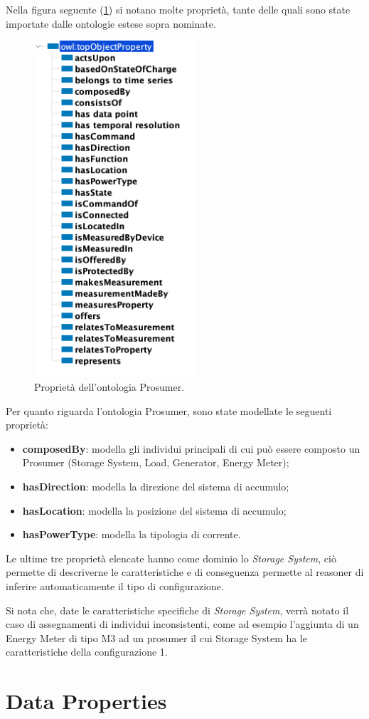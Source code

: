 Nella figura seguente (\ref*{fig:proprieta_prosumer}) si notano molte proprietà, tante delle quali sono state importate dalle ontologie estese sopra nominate.
\begin{figure}[!ht]
    \centering
    \includegraphics[width=6cm]{images/proprieta_prosumer.png}
    \caption{Proprietà dell'ontologia Prosumer.}
    \label{fig:proprieta_prosumer}
\end{figure}

Per quanto riguarda l'ontologia Prosumer, sono state modellate le seguenti proprietà:
\begin{itemize}
    \item \textbf{composedBy}: modella gli individui principali di cui può essere composto un Prosumer (Storage System, Load, Generator, Energy Meter);
    \item \textbf{hasDirection}: modella la direzione del sistema di accumulo;
    \item \textbf{hasLocation}: modella la posizione del sistema di accumulo;
    \item \textbf{hasPowerType}: modella la tipologia di corrente.
\end{itemize}

Le ultime tre proprietà elencate hanno come dominio lo \textit{Storage System}, ciò permette di descriverne le caratteristiche e di conseguenza permette al reasoner di inferire automaticamente il tipo di configurazione.

Si nota che, date le caratteristiche specifiche di \textit{Storage System}, verrà notato il caso di assegnamenti di individui inconsistenti, come ad esempio l'aggiunta di un Energy Meter di tipo M3 ad un prosumer il cui Storage System ha le caratteristiche della configurazione 1.

\section{Data Properties}

